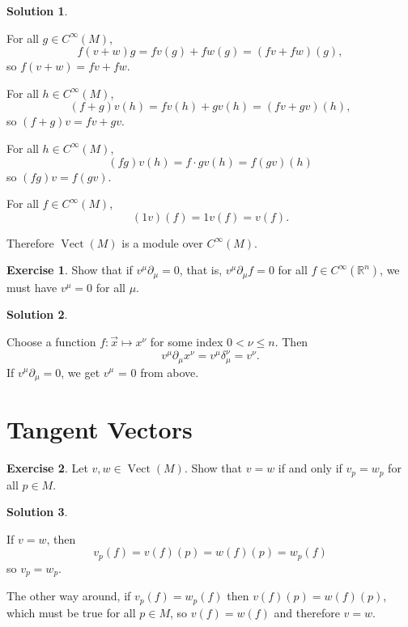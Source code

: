\documentclass[11pt, a4paper]{report}
\theoremstyle{definition}
\newtheorem{exercise}{Exercise}[part]
\newtheorem{solution}{Solution}[part]
\newenvironment{ex}{\begin{exercise}}{\end{exercise}\pagebreak[1]}
\newenvironment{sol}{\begin{solution}}{\end{solution}\pagebreak[3]}
\renewcommand{\leq}{\leqslant}
\DeclareMathOperator{\Vect}{Vect}
\begin{document}
\begin{sol}\label{sol:module}

For all $g \in C^\infty(M)$,
\[
    f(v + w)g = fv(g) + fw(g) = (fv + fw)(g),
\]
so $f(v + w) = fv + fw$.

For all $h \in C^\infty(M)$,
\[
    (f + g)v(h) = fv(h) + gv(h) = (fv + gv)(h),
\]
so $(f + g)v = fv + gv$.


For all $h \in C^\infty(M)$,
\[
    (fg)v(h) = f \cdot gv(h) = f(gv)(h)
\]
so $(fg)v = f(gv)$.

For all $f \in C^\infty(M)$,
\[
    (1v)(f) = 1v(f) = v(f).
\]

Therefore $\Vect(M)$ is a module over $C^\infty(M)$.

\end{sol}

\begin{ex}

Show that if $v^\mu\partial_\mu = 0$, that is, $v^\mu \partial_\mu f = 0$ for all $f \in C^\infty(\mathbb{R}^n)$, we must have $v^\mu = 0$ for all $\mu$.

\end{ex}

\begin{sol}\label{sol:basis}

Choose a function $f: \vec{x} \mapsto x^\nu$ for some index $0 < \nu \leq n$. Then
\[
    v^\mu \partial_\mu x^\nu = v^\mu \delta_\mu^\nu = v^\nu.
\]
If $v^\mu\partial_\mu = 0$, we get $v^\mu$ = 0 from above.

\end{sol}

\section{Tangent Vectors}

\begin{ex}

Let $v, w \in \Vect(M)$. Show that $v = w$ if and only if $v_p = w_p$ for all $p \in M$.

\end{ex}

\begin{sol}\label{sol:tangentvectorpointequality}

If $v = w$, then
\[
    v_p(f) = v(f)(p) = w(f)(p) = w_p(f)
\]
so $v_p = w_p$.

The other way around, if $v_p(f) = w_p(f)$ then $v(f)(p) = w(f)(p)$, which must be true for all $p \in M$, so $v(f) = w(f)$ and therefore $v = w$.

\end{sol}
\end{document}
